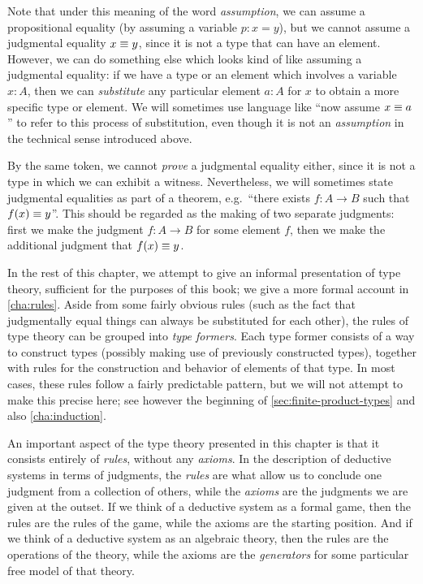 Note that under this meaning of the word \emph{assumption}, we can assume a propositional equality (by assuming a variable $p:x=y$), but we cannot assume a judgmental equality $x\equiv y$, since it is not a type that can have an element.
However, we can do something else which looks kind of like assuming a judgmental equality: if we have a type or an element which involves a variable $x:A$, then we can \emph{substitute} any particular element $a:A$ for $x$ to obtain a more specific type or element.
We will sometimes use language like ``now assume $x\equiv a$'' to refer to this process of substitution, even though it is not an \emph{assumption} in the technical sense introduced above.
%

By the same token, we cannot \emph{prove} a judgmental equality either, since it is not a type in which we can exhibit a witness.
Nevertheless, we will sometimes state judgmental equalities as part of a theorem, e.g.\ ``there exists $f:A\to B$ such that $f(x)\equiv y$''.
This should be regarded as the making of two separate judgments: first we make the judgment $f:A\to B$ for some element $f$, then we make the additional judgment that $f(x)\equiv y$.

In the rest of this chapter, we attempt to give an informal presentation of type theory, sufficient for the purposes of this book; we give a more formal account in \cref{cha:rules}.
Aside from some fairly obvious rules (such as the fact that judgmentally equal things can always be substituted for each other), the rules of type theory can be grouped into \emph{type formers}.
Each type former consists of a way to construct types (possibly making use of previously constructed types), together with rules for the construction and behavior of elements of that type.
In most cases, these rules follow a fairly predictable pattern, but we will not attempt to make this precise here; see however the beginning of \cref{sec:finite-product-types} and also \cref{cha:induction}.


%
%
An important aspect of the type theory presented in this chapter is that it consists entirely of \emph{rules}, without any \emph{axioms}.
In the description of deductive systems in terms of judgments, the \emph{rules} are what allow us to conclude one judgment from a collection of others, while the \emph{axioms} are the judgments we are given at the outset.
If we think of a deductive system as a formal game, then the rules are the rules of the game, while the axioms are the starting position.
And if we think of a deductive system as an algebraic theory, then the rules are the operations of the theory, while the axioms are the \emph{generators} for some particular free model of that theory.

